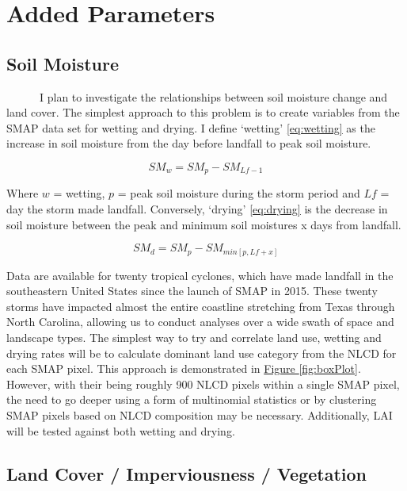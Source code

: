 \documentclass[
]{book}
\begin{document}
\hypertarget{added-parameters}{%
\section{Added Parameters}\label{added-parameters}}

\hypertarget{soil-moisture}{%
\subsection{Soil Moisture}\label{soil-moisture}}

~~~~~~I plan to investigate the relationships between soil moisture change and land cover. The simplest approach to this problem is to create variables from the SMAP data set for wetting and drying. I define `wetting' \eqref{eq:wetting} as the increase in soil moisture from the day before landfall to peak soil moisture.

\begin{equation} 
  SM_{w} = SM_{p} - SM_{Lf-1}
  \label{eq:wetting}
\end{equation}

Where \(w\) = wetting, \(p\) = peak soil moisture during the storm period and \(Lf\) = day the storm made landfall. Conversely, `drying' \eqref{eq:drying} is the decrease in soil moisture between the peak and minimum soil moistures x days from landfall.

\begin{equation} 
  SM_{d} = SM_{p} - SM_{min[p,Lf+x]}
  \label{eq:drying}
\end{equation}

Data are available for twenty tropical cyclones, which have made landfall in the southeastern United States since the launch of SMAP in 2015. These twenty storms have impacted almost the entire coastline stretching from Texas through North Carolina, allowing us to conduct analyses over a wide swath of space and landscape types. The simplest way to try and correlate land use, wetting and drying rates will be to calculate dominant land use category from the NLCD for each SMAP pixel. This approach is demonstrated in \protect\hyperlink{fig:boxPlot}{Figure \ref{fig:boxPlot}}. However, with their being roughly 900 NLCD pixels within a single SMAP pixel, the need to go deeper using a form of multinomial statistics or by clustering SMAP pixels based on NLCD composition may be necessary. Additionally, LAI will be tested against both wetting and drying.

\hypertarget{land-cover-imperviousness-vegetation}{%
\subsection{Land Cover / Imperviousness / Vegetation}\label{land-cover-imperviousness-vegetation}}
\end{document}
